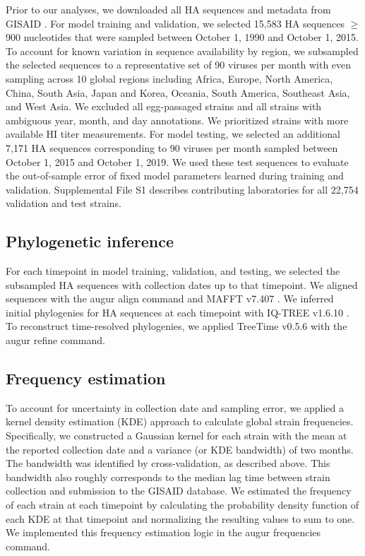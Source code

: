 Prior to our analyses, we downloaded all HA sequences and metadata from GISAID \cite{shu2017gisaid}.
For model training and validation, we selected 15,583 HA sequences $\geq$900 nucleotides that were sampled between October 1, 1990 and October 1, 2015.
To account for known variation in sequence availability by region, we subsampled the selected sequences to a representative set of 90 viruses per month with even sampling across 10 global regions including Africa, Europe, North America, China, South Asia, Japan and Korea, Oceania, South America, Southeast Asia, and West Asia.
We excluded all egg-passaged strains and all strains with ambiguous year, month, and day annotations.
We prioritized strains with more available HI titer measurements.
For model testing, we selected an additional 7,171 HA sequences corresponding to 90 viruses per month sampled between October 1, 2015 and October 1, 2019.
We used these test sequences to evaluate the out-of-sample error of fixed model parameters learned during training and validation.
Supplemental File S1 describes contributing laboratories for all 22,754 validation and test strains.

\subsection*{Phylogenetic inference}

For each timepoint in model training, validation, and testing, we selected the subsampled HA sequences with collection dates up to that timepoint.
We aligned sequences with the augur align command \cite{Hadfield2018} and MAFFT v7.407 \cite{Katoh2002}.
We inferred initial phylogenies for HA sequences at each timepoint with IQ-TREE v1.6.10 \cite{Nguyen2014}.
To reconstruct time-resolved phylogenies, we applied TreeTime v0.5.6 \cite{Sagulenko2018} with the augur refine command.

\subsection*{Frequency estimation}

To account for uncertainty in collection date and sampling error, we applied a kernel density estimation (KDE) approach to calculate global strain frequencies.
Specifically, we constructed a Gaussian kernel for each strain with the mean at the reported collection date and a variance (or KDE bandwidth) of two months.
The bandwidth was identified by cross-validation, as described above.
This bandwidth also roughly corresponds to the median lag time between strain collection and submission to the GISAID database.
We estimated the frequency of each strain at each timepoint by calculating the probability density function of each KDE at that timepoint and normalizing the resulting values to sum to one.
We implemented this frequency estimation logic in the augur frequencies command.

